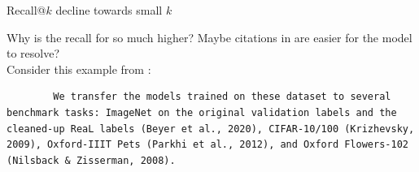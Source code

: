 \begin{frame}{Recall@$k$ decline towards small $k$}
    \begin{table}[t]
        \begin{center}
        \end{center}
        \caption{Cumulative Recall@$k$ difference from $k=10$ over $k=5$ to $k=1$.}
        \label{tab:cumulative_recall_loss}
    \end{table}
\end{frame}

\begin{frame}[fragile]{Why is the recall for  so much higher?}
    Maybe citations in  are easier for the model to resolve?\\
    Consider this example from \cite{dosovitskiy2020image}:
    \begin{lstlisting}
        We transfer the models trained on these dataset to several benchmark tasks: ImageNet on the original validation labels and the cleaned-up ReaL labels (Beyer et al., 2020), CIFAR-10/100 (Krizhevsky, 2009), Oxford-IIIT Pets (Parkhi et al., 2012), and Oxford Flowers-102 (Nilsback & Zisserman, 2008).
    \end{lstlisting}
    \begin{table}[t]
        \begin{center}
        \end{center}
        \caption{Fraction of cases where the last token before the citation appears in the abstract of the cited document.}
        \label{tab:last_token}
    \end{table}
\end{frame}

